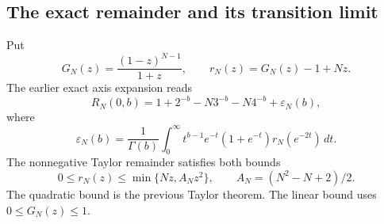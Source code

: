 \documentclass[11pt]{article}
\numberwithin{equation}{section}
\theoremstyle{definition}
\theoremstyle{remark}
\begin{document}
\subsection{The exact remainder and its transition limit}
Put
\[
 G_N(z)=\frac{(1-z)^{N-1}}{1+z},\qquad
 r_N(z)=G_N(z)-1+Nz.
\]
The earlier exact axis expansion reads
\begin{equation}\label{eul:eq:axis-second-start}
 R_N(0,b)=1+2^{-b}-N3^{-b}-N4^{-b}+\varepsilon_N(b),
\end{equation}
where
\begin{equation}\label{eul:eq:epsilon-integral}
 \varepsilon_N(b)=\frac1{\Gamma(b)}\int_0^\infty
 t^{b-1}e^{-t}(1+e^{-t})r_N(e^{-2t})\,dt.
\end{equation}
The nonnegative Taylor remainder satisfies both bounds
\begin{equation}\label{eul:eq:two-remainder-bounds}
 0\leq r_N(z)\leq\min\{Nz,A_Nz^2\},\qquad
 A_N=(N^2-N+2)/2.
\end{equation}
The quadratic bound is the previous Taylor theorem.  The linear bound
uses $0\leq G_N(z)\leq1$.
\end{document}
